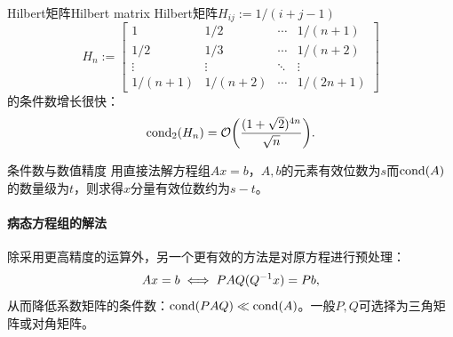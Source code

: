 \begin{example}
    {Hilbert矩阵}{Hilbert matrix}
    Hilbert矩阵$H_{ij} := 1/(i + j - 1)$
    \begin{equation*}
        H_n := \begin{bmatrix}
            1&1/2&\cdots&1/(n + 1)\\
            1/2&1/3&\cdots&1/(n + 2)\\
            \vdots&\vdots&\ddots&\vdots\\
            1/(n + 1)&1/(n + 2)&\cdots&1/(2n + 1)
        \end{bmatrix}
    \end{equation*}
    的条件数增长很快：
    \begin{equation}\label{eq:na-hilbert-condition-asymptotic}
        \operatorname{cond}_2(H_n) = \mathcal{O}\biggl(\frac{(1 + \sqrt2)^{4n}}{\sqrt n}\biggr).
    \end{equation}
\end{example}

\begin{theorem}
    {条件数与数值精度}{}
    用直接法解方程组$Ax = b$，$A,b$的元素有效位数为$s$而$\operatorname{cond}(A)$的数量级为$t$，则求得$x$分量有效位数约为$s - t$。
\end{theorem}

\paragraph{病态方程组的解法}

除采用更高精度的运算外，另一个更有效的方法是对原方程进行预处理：
\begin{equation}\label{eq:na-two-sided-preconditioning}
    Ax = b \iff PAQ(Q^{-1} x) = Pb,
\end{equation}
从而降低系数矩阵的条件数：$\operatorname{cond}(PAQ) \ll \operatorname{cond}(A)$。一般$P,Q$可选择为三角矩阵或对角矩阵。

